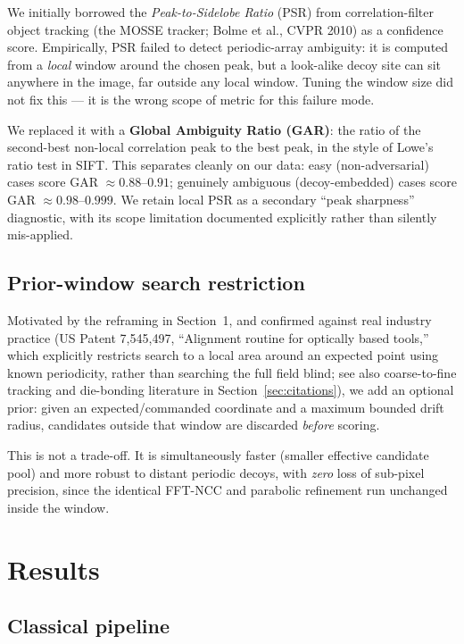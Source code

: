 \documentclass[11pt]{article}
\begin{document}
We initially borrowed the \emph{Peak-to-Sidelobe Ratio} (PSR) from
correlation-filter object tracking (the MOSSE tracker; Bolme et al.,
CVPR 2010) as a confidence score. Empirically, PSR failed to detect
periodic-array ambiguity: it is computed from a \emph{local} window around
the chosen peak, but a look-alike decoy site can sit anywhere in the
image, far outside any local window. Tuning the window size did not fix
this --- it is the wrong scope of metric for this failure mode.

We replaced it with a \textbf{Global Ambiguity Ratio (GAR)}: the ratio of
the second-best non-local correlation peak to the best peak, in the style
of Lowe's ratio test in SIFT. This separates cleanly on our data: easy
(non-adversarial) cases score GAR $\approx 0.88$--$0.91$; genuinely
ambiguous (decoy-embedded) cases score GAR $\approx 0.98$--$0.999$. We
retain local PSR as a secondary ``peak sharpness'' diagnostic, with its
scope limitation documented explicitly rather than silently mis-applied.

\subsection{Prior-window search restriction}
\label{sec:prior}

Motivated by the reframing in Section~1, and confirmed against real
industry practice (US Patent 7,545,497, ``Alignment routine for optically
based tools,'' which explicitly restricts search to a local area around
an expected point using known periodicity, rather than searching the full
field blind; see also coarse-to-fine tracking and die-bonding literature
in Section~\ref{sec:citations}), we add an optional prior: given an
expected/commanded coordinate and a maximum bounded drift radius,
candidates outside that window are discarded \emph{before} scoring.

This is not a trade-off. It is simultaneously faster (smaller effective
candidate pool) and more robust to distant periodic decoys, with
\emph{zero} loss of sub-pixel precision, since the identical FFT-NCC and
parabolic refinement run unchanged inside the window.

\section{Results}

\subsection{Classical pipeline}
\end{document}

